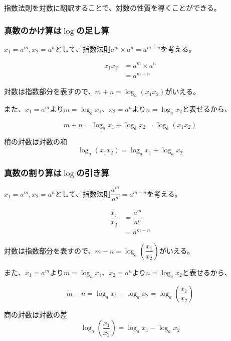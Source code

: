 \documentclass[../math-imaging]{subfiles}
\begin{document}
指数法則を対数に翻訳することで、対数の性質を導くことができる。

\subsubsection{真数のかけ算は$\log$の足し算}

$x_1 = a^m, x_2 = a^n$として、指数法則$a^m \times a^n = a^{m+n}$を考える。

\begin{align}
  x_1  x_2 & = a^m \times a^n \\
           & = a^{m+n}
\end{align}

対数は指数部分を表すので、$m+n = \log_a (x_1x_2)$がいえる。

また、$x_1 = a^m$より$m = \log_a x_1$、$x_2 = a^n$より$n = \log_a x_2$と表せるから、

\begin{equation}
  m + n = \log_a x_1 + \log_a x_2 = \log_a (x_1x_2)
\end{equation}

\begin{theorem}{積の対数は対数の和}
  \LARGE
  \begin{equation}
    \log_a (x_1x_2) = \log_a x_1 + \log_a x_2
  \end{equation}
\end{theorem}

\subsubsection{真数の割り算は$\log$の引き算}

$x_1 = a^m, x_2 = a^n$として、指数法則$\dfrac{a^m}{a^n} = a^{m-n}$を考える。

\begin{align}
  \dfrac{x_1}{x_2} & = \dfrac{a^m}{a^n} \\
                   & = a^{m-n}
\end{align}

対数は指数部分を表すので、$m-n = \log_a \left( \dfrac{x_1}{x_2} \right)$がいえる。

また、$x_1 = a^m$より$m = \log_a x_1$、$x_2 = a^n$より$n = \log_a x_2$と表せるから、

\begin{equation}
  m - n = \log_a x_1 - \log_a x_2 = \log_a \left( \dfrac{x_1}{x_2} \right)
\end{equation}

\begin{theorem}{商の対数は対数の差}
  \LARGE
  \begin{equation}
    \log_a \left( \dfrac{x_1}{x_2} \right) = \log_a x_1 - \log_a x_2
  \end{equation}
\end{theorem}
\end{document}
